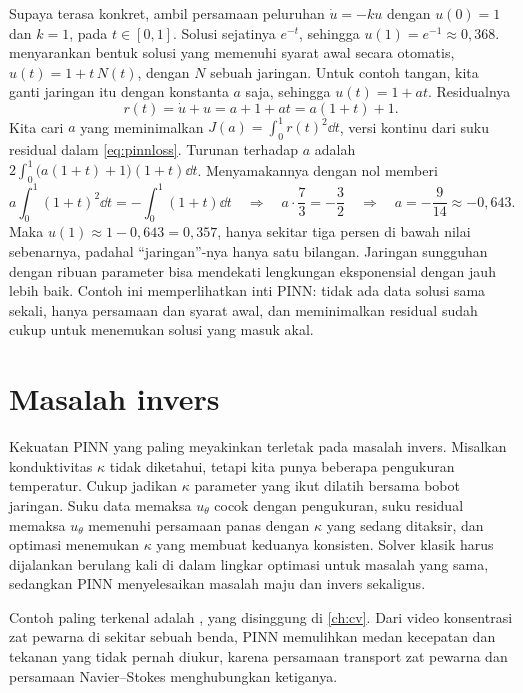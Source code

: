 Supaya terasa konkret, ambil persamaan peluruhan $\dot u=-ku$ dengan $u(0)=1$ dan $k=1$, pada
$t\in[0,1]$. Solusi sejatinya $e^{-t}$, sehingga $u(1)=e^{-1}\approx0{,}368$. \citet{lagaris1998}
menyarankan bentuk solusi yang memenuhi syarat awal secara otomatis, $u(t)=1+t\,N(t)$, dengan $N$ sebuah
jaringan. Untuk contoh tangan, kita ganti jaringan itu dengan konstanta $a$ saja, sehingga
$u(t)=1+at$. Residualnya
\begin{equation}
r(t)=\dot u+u=a+1+at=a(1+t)+1.
\end{equation}
Kita cari $a$ yang meminimalkan $J(a)=\int_0^1r(t)^2\dd t$, versi kontinu dari suku residual dalam
\cref{eq:pinnloss}. Turunan terhadap $a$ adalah $2\int_0^1\big(a(1+t)+1\big)(1+t)\dd t$. Menyamakannya
dengan nol memberi
\begin{equation}
a\int_0^1(1+t)^2\dd t=-\int_0^1(1+t)\dd t
\quad\Longrightarrow\quad a\cdot\frac73=-\frac32
\quad\Longrightarrow\quad a=-\frac9{14}\approx-0{,}643.
\end{equation}
Maka $u(1)\approx1-0{,}643=0{,}357$, hanya sekitar tiga persen di bawah nilai sebenarnya, padahal
``jaringan''-nya hanya satu bilangan. Jaringan sungguhan dengan ribuan parameter bisa mendekati
lengkungan eksponensial dengan jauh lebih baik. Contoh ini memperlihatkan inti PINN: tidak ada data
solusi sama sekali, hanya persamaan dan syarat awal, dan meminimalkan residual sudah cukup untuk
menemukan solusi yang masuk akal.

\section{Masalah invers}

Kekuatan PINN yang paling meyakinkan terletak pada masalah invers. Misalkan konduktivitas $\kappa$ tidak
diketahui, tetapi kita punya beberapa pengukuran temperatur. Cukup jadikan $\kappa$ parameter yang ikut
dilatih bersama bobot jaringan. Suku data memaksa $u_\theta$ cocok dengan pengukuran, suku residual
memaksa $u_\theta$ memenuhi persamaan panas dengan $\kappa$ yang sedang ditaksir, dan optimasi menemukan
$\kappa$ yang membuat keduanya konsisten. Solver klasik harus dijalankan berulang kali di dalam lingkar
optimasi untuk masalah yang sama, sedangkan PINN menyelesaikan masalah maju dan invers sekaligus.

Contoh paling terkenal adalah \citet{raissi2020}, yang disinggung di \cref{ch:cv}. Dari video konsentrasi
zat pewarna di sekitar sebuah benda, PINN memulihkan medan kecepatan dan tekanan yang tidak pernah
diukur, karena persamaan transport zat pewarna dan persamaan Navier--Stokes menghubungkan ketiganya.


